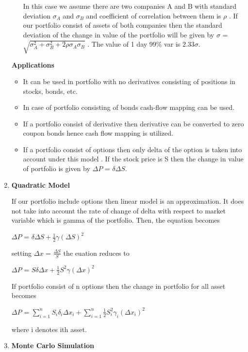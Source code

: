 \documentclass[11pt]{article}
\numberwithin{equation}{section}
\begin{document}
\begin{enumerate}
\begin{enumerate}
		In this case we assume there are two companies A and B with standard deviation $ \sigma_A $ and $ \sigma_B $ and coefficient of correlation between them is $\rho $ . If our portfolio consist of assets of both companies then the standard deviation of the change in value of the portfolio will be given by $ \sigma $ =  $\sqrt{\sigma_A^{2}+\sigma_B^{2}+2\rho\sigma_A\sigma_B}$ . The value of 1 day 99\% var is  $2.33\sigma$. 
		\end{enumerate}
	\textbf{Applications}\medskip
	\begin{itemize}
	\item It can be used in portfolio with no derivatives consisting of positions in stocks, bonds, etc.
	\item In case of portfolio consisting of bonds cash-flow mapping can be used.  
	\item If a portfolio consist of derivative then derivative can be converted to zero coupon bonds hence cash flow mapping is utilized.
	\item If a portfolio consist of options then only delta of  the option is taken into account under this model . If the stock price is S then the change in value of portfolio is given by $\Delta P$ = $\delta \Delta S $.
	\end{itemize}
	\pagebreak
	
	\item\textbf{Quadratic Model}\medskip
	
	If our portfolio include options then linear model is an approximation. It does not take into account the rate of change of delta with respect to market variable which is gamma of the portfolio. Then, the equation becomes \medskip
	\begin{center}
	$\Delta P$ = $\delta \Delta S + \frac{1}{2}\gamma (\Delta S)^{2}$
	\end{center}
	setting $\Delta x$ = $\frac{\Delta S}{S}$ the euation reduces to
		\begin{center}
	$\Delta P$ = $S\delta \Delta x + \frac{1}{2} S^{2}\gamma (\Delta x)^{2}$
	\end{center}
	If portfolio consist of n options then the change in portfolio for all asset becomes
	\begin{center}
	$\Delta P$ = $\sum_{i=1}^n S_i\delta_i \Delta x_i + \sum_{i=1}^n \frac{1}{2} S_i^{2}\gamma_i (\Delta x_i)^{2}$
	\end{center}
	where i denotes ith asset. 
	\item\textbf{Monte Carlo Simulation}\medskip
	

\end{enumerate}
\end{document}
